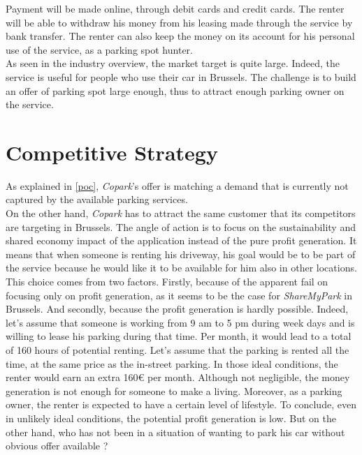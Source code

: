 \documentclass[12pt,a4paper,oneside]{book}
\newcommand{\bp}{\textit{Copark}}
\begin{document}
Payment will be made online, through debit cards and credit cards. The renter will be able to withdraw his money from his leasing made through the service by bank transfer. The renter can also keep the money on its account for his personal use of the service, as a parking spot hunter.\\

As seen in the industry overview, the market target is quite large. Indeed, the service is useful for people who use their car in Brussels. The challenge is to build an offer of parking spot large enough, thus to attract enough parking owner on the service.

\section{Competitive Strategy}
\label{cst}
As explained in \autoref{poc}, \bp{}'s offer is matching a demand that is currently not captured by the available parking services.\\

On the other hand, \bp{} has to attract the same customer that its competitors are targeting in Brussels. The angle of action is to focus on the sustainability and shared economy impact of the application instead of the pure profit generation. It means that when someone is renting his driveway, his goal would be to be part of the service because he would like it to be available for him also in other locations.\\

This choice comes from two factors. Firstly, because of the apparent fail on focusing only on profit generation, as it seems to be the case for \textit{ShareMyPark} in Brussels. And secondly, because the profit generation is hardly possible. Indeed, let's assume that someone is working from 9 am to 5 pm during week days and is willing to lease his parking during that time. Per month, it would lead to a total of 160 hours of potential renting. Let's assume that the parking is rented all the time, at the same price as the in-street parking. In those ideal conditions, the renter would earn an extra 160\euro{}  per month. Although not negligible, the money generation is not enough for someone to make a living. Moreover, as a parking owner, the renter is expected to have a certain level of lifestyle. To conclude, even in unlikely ideal conditions, the potential profit generation is low. But on the other hand, who has not been in a situation of wanting to park his car without obvious offer available ?\\
\end{document}
